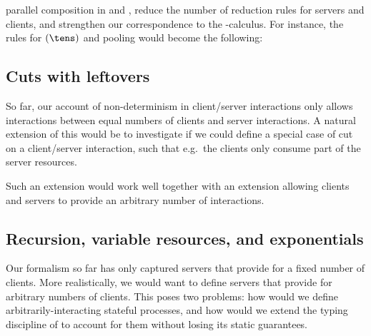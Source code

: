 \documentclass[UKenglish]{llncs}
\begin{document}
parallel composition in \cp and \nodcap, reduce the number of reduction rules
for servers and clients, and strengthen our correspondence to the
\textpi-calculus. For instance, the rules for \((\tens)\) and pooling would
become the following:
\begin{center}
  \begin{prooftree*}
    \SYM{( \tens )}
  \end{prooftree*}
  \begin{prooftree*}
  \end{prooftree*}
\end{center}

\subsection{Cuts with leftovers}
So far, our account of non-determinism in client/server interactions only allows
interactions between equal numbers of clients and server interactions. A natural
extension of this would be to investigate if we could define a special case of
cut on a client/server interaction, such that e.g.\ the clients only consume
part of the server resources.
\begin{scprooftree}
\end{scprooftree}
Such an extension would work well together with an extension allowing clients
and servers to provide an arbitrary number of interactions.

\subsection{Recursion, variable resources, and exponentials}
Our formalism so far has only captured servers that provide for a fixed number
of clients.  More realistically, we would want to define servers that provide
for arbitrary numbers of clients.  This poses two problems: how would we define
arbitrarily-interacting stateful processes, and how would we extend the
typing discipline of \nodcap to account for them without losing its static
guarantees.
\end{document}

